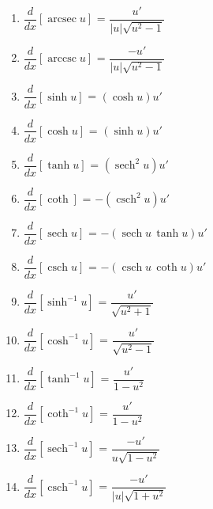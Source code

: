 \documentclass[10pt]{article}
\newcommand{\ddx}[1]{ $ \dfrac{d}{dx} \left[ #1 \right] $ }
\newcommand{\m}[1]{ $ \displaystyle #1 $ }
\DeclareMathOperator{\arcsec}{arcsec}
\DeclareMathOperator{\arccsc}{arccsc}
\DeclareMathOperator{\sech}{sech}
\DeclareMathOperator{\csch}{csch}
\begin{document}
\begin{center}
{\begin{minipage}{0.98\textwidth}
\begin{multicols}{3}
\begin{enumerate}
		\item \ddx{\arcsec u } = \m{\dfrac{u'}{| u |\sqrt{u^2 - 1}}}
		\item \ddx{\arccsc u} = \m{\dfrac{-u'}{| u |\sqrt{u^2 - 1}}}
		\item \ddx{\sinh u} = \m{(\cosh u)u'}
		\item \ddx{\cosh u} =\m{(\sinh u) u'}
		\item \ddx{\tanh u } = \m{(\sech^2 u) u'}
		\item \ddx{\coth} = \m{-(\csch^2 u)u'}
		\item \ddx{\sech u} = \m{-(\sech u \, \tanh u)u'}
		\item \ddx{\csch u} = \m{-(\csch u\, \coth u)u'}
		\item \ddx{\sinh^{-1} u} = \m{\dfrac{u'}{\sqrt{u^2 + 1}}}
		\item \ddx{\cosh^{-1} u} = \m{\dfrac{u'}{\sqrt{u^2 - 1}}}
		\item \ddx{\tanh^{-1} u} = \m{\dfrac{u'}{1 - u^2}}
		\item \ddx{\coth^{-1} u} = \m{\dfrac{u'}{1 - u^2}}
		\item \ddx{\sech^{-1} u} = \m{\dfrac{-u'}{u \sqrt{1 - u^2}}}
		\item \ddx{\csch^{-1} u} = \m{\dfrac{-u'}{| u | \sqrt{1 + u^2}}}
	\end{enumerate}\end{multicols}


\end{minipage}}
\end{center}
\end{document}
